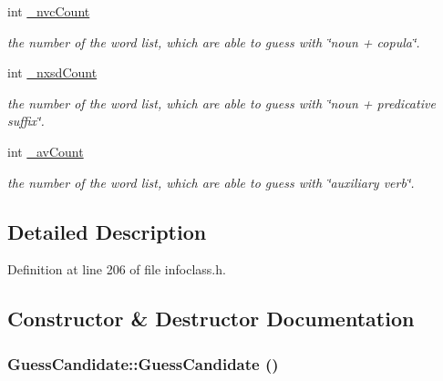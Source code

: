 \begin{CompactItemize}
int \hyperlink{classGuessCandidate_ab107dd9132f2ffd4293bef3f504eee5}{\_\-nvcCount}
\begin{CompactList}\small\item\em the number of the word list, which are able to guess with \char`\"{}noun + copula\char`\"{}. \item\end{CompactList}\item 
int \hyperlink{classGuessCandidate_d55bb019c674eac31e008aabd991cf09}{\_\-nxsdCount}
\begin{CompactList}\small\item\em the number of the word list, which are able to guess with \char`\"{}noun + predicative suffix\char`\"{}. \item\end{CompactList}\item 
int \hyperlink{classGuessCandidate_3a7ad0eae4852041514cbd517ea5920d}{\_\-avCount}
\begin{CompactList}\small\item\em the number of the word list, which are able to guess with \char`\"{}auxiliary verb\char`\"{}. \item\end{CompactList}\end{CompactItemize}


\subsection{Detailed Description}


Definition at line 206 of file infoclass.h.

\subsection{Constructor \& Destructor Documentation}
\hypertarget{classGuessCandidate_e70b08d1594bbee7a858bd3daa3e56cf}{
\subsubsection[{GuessCandidate}]{\setlength{\rightskip}{0pt plus 5cm}GuessCandidate::GuessCandidate ()}}
\label{classGuessCandidate_e70b08d1594bbee7a858bd3daa3e56cf}




